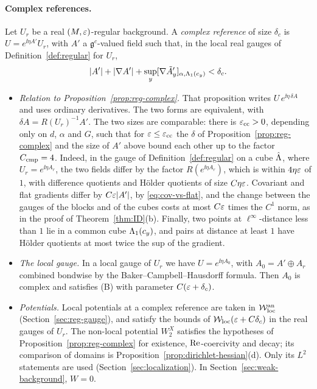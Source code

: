 \paragraph{Complex references.} Let $U_r$ be a real $(M,\varepsilon)$-regular background. A \emph{complex reference} of size $\delta_c$ is $U=e^{\ii\eta A'}U_r$, with $A'$ a $\mathfrak g^c$-valued field such that, in the local real gauges of Definition~\ref{def:regular} for $U_r$,
\[
|A'|+|\nabla A'|+\sup_y[\nabla\tilde A'_y]_{\alpha,\Lambda_1(c_y)}<\delta_c .
\]
\begin{itemize}
\item \emph{Relation to Proposition~\ref{prop:reg-complex}.} That proposition writes $U\,e^{\ii\eta\,\delta\!A}$ and uses ordinary derivatives. The two forms are equivalent, with $\delta\!A=R(U_r)^{-1}A'$. The two sizes are comparable: there is $\varepsilon_{\rm cc}>0$, depending only on $d$, $\alpha$ and $G$, such that for $\varepsilon\le\varepsilon_{\rm cc}$ the $\delta$ of Proposition~\ref{prop:reg-complex} and the size of $A'$ above bound each other up to the factor $C_{\rm cmp}=4$. Indeed, in the gauge of Definition~\ref{def:regular} on a cube $\hat{\Lambda}$, where $U_r=e^{\ii\eta A_r}$, the two fields differ by the factor $R(e^{\ii\eta A_r})$, which is within $4\eta\varepsilon$ of $1$, with difference quotients and H\"older quotients of size $C\eta\varepsilon$. Covariant and flat gradients differ by $C\varepsilon|A'|$, by \eqref{eq:cov-vs-flat}, and the change between the gauges of the blocks and of the cubes costs at most $C\varepsilon$ times the $C^1$ norm, as in the proof of Theorem~\ref{thm:ID}(b). Finally, two points at $\ell^\infty$-distance less than $1$ lie in a common cube $\Lambda_1(c_y)$, and pairs at distance at least $1$ have H\"older quotients at most twice the sup of the gradient.
\item \emph{The local gauge.} In a local gauge of $U_r$ we have $U=e^{\ii\eta A_0}$, with $A_0=A'\oplus A_r$ combined bondwise by the Baker--Campbell--Hausdorff formula. Then $A_0$ is complex and satisfies (B) with parameter $C(\varepsilon+\delta_c)$.
\item \emph{Potentials.} Local potentials at a complex reference are taken in $\mathcal W^{\rm an}_{\rm loc}$ (Section~\ref{sec:reg-gauge}), and satisfy the bounds of $\mathcal W_{\rm loc}(\varepsilon+C\delta_c)$ in the real gauges of $U_r$. The non-local potential $W_2^X$ satisfies the hypotheses of Proposition~\ref{prop:reg-complex} for existence, $\operatorname{Re}$-coercivity and decay; its comparison of domains is Proposition~\ref{prop:dirichlet-hessian}(d). Only its $L^2$ statements are used (Section~\ref{sec:localization}). In Section~\ref{sec:weak-background}, $W=0$.

\end{itemize}
